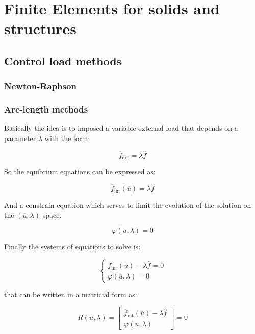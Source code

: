 \chapter{Finite Elements for solids and structures}

\section{Control load methods}

\subsection{Newton-Raphson}

\subsection{Arc-length methods}

Basically the idea is to imposed a variable external load that depends on a parameter $\lambda$ with the form:

\begin{equation}
\overline{f}_{\text{ext}} = \lambda \hat{f}
\end{equation}

So the equibrium equations can be expressed as:

\begin{equation}
\overline{f}_{\text{int}}(\overline{u}) = \lambda \hat{f}
\end{equation}

And a constrain equation which serves to limit the evolution of the solution on the $(\overline{u},\lambda)$ space.

\begin{equation}
\varphi(\overline{u},\lambda) = 0
\end{equation}

Finally the systems of equations to solve is:

\begin{equation}
\begin{cases} 
\overline{f}_{\text{int}}(\overline{u}) - \lambda \hat{f} = 0\\ 
\varphi(\overline{u},\lambda) = 0 
\end{cases}
\end{equation}

that can be written in a matricial form as:

\begin{equation}
  \overline{R}(\overline{u},\lambda) =
  \begin{bmatrix}
  \overline{f}_{\text{int}}(\overline{u}) - \lambda \hat{f} \\ 
  \varphi(\overline{u},\lambda) 
  \end{bmatrix}
  = \overline{0}
\label{arclen_sys_eq}
\end{equation}

